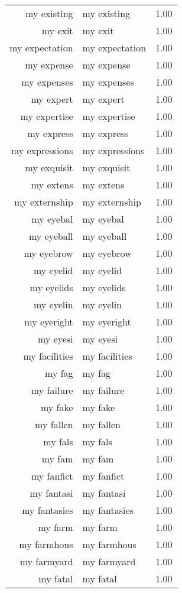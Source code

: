 \begin{table}[ht]
\begin{tabular}{rlr}
  my existing & my existing & 1.00 \\ 
  my exit & my exit & 1.00 \\ 
  my expectation & my expectation & 1.00 \\ 
  my expense & my expense & 1.00 \\ 
  my expenses & my expenses & 1.00 \\ 
  my expert & my expert & 1.00 \\ 
  my expertise & my expertise & 1.00 \\ 
  my express & my express & 1.00 \\ 
  my expressions & my expressions & 1.00 \\ 
  my exquisit & my exquisit & 1.00 \\ 
  my extens & my extens & 1.00 \\ 
  my externship & my externship & 1.00 \\ 
  my eyebal & my eyebal & 1.00 \\ 
  my eyeball & my eyeball & 1.00 \\ 
  my eyebrow & my eyebrow & 1.00 \\ 
  my eyelid & my eyelid & 1.00 \\ 
  my eyelids & my eyelids & 1.00 \\ 
  my eyelin & my eyelin & 1.00 \\ 
  my eyeright & my eyeright & 1.00 \\ 
  my eyesi & my eyesi & 1.00 \\ 
  my facilities & my facilities & 1.00 \\ 
  my fag & my fag & 1.00 \\ 
  my failure & my failure & 1.00 \\ 
  my fake & my fake & 1.00 \\ 
  my fallen & my fallen & 1.00 \\ 
  my fals & my fals & 1.00 \\ 
  my fam & my fam & 1.00 \\ 
  my fanfict & my fanfict & 1.00 \\ 
  my fantasi & my fantasi & 1.00 \\ 
  my fantasies & my fantasies & 1.00 \\ 
  my farm & my farm & 1.00 \\ 
  my farmhous & my farmhous & 1.00 \\ 
  my farmyard & my farmyard & 1.00 \\ 
  my fatal & my fatal & 1.00 \\ 

\end{tabular}
\end{table}

